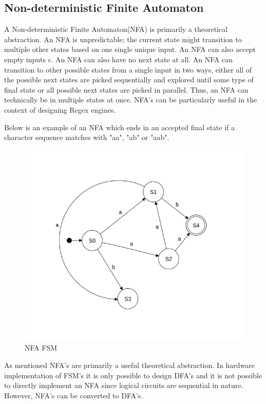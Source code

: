 \documentclass[a4paper,11pt]{article}
\begin{document}
\subsection*{Non-deterministic Finite Automaton}
A Non-deterministic Finite Automaton(NFA) is primarily a theoretical abstraction. An NFA is unpredictable; the current state might transition to multiple other states based on one single unique input. An NFA can also accept empty inputs $\epsilon$. An NFA can also have no next state at all. An NFA can transition to other possible states from a single input in two ways, either all of the possible next states are picked sequentially and explored until some type of final state or all possible next states are picked in parallel. Thus, an NFA can technically be in multiple states at once. NFA's can be particularly useful in the context of designing Regex engines. 

Below is an example of an NFA  which ends in an accepted final state if a character sequence matches with "aa", "ab" or "aab". 
\begin{figure}[H]
    \centering
    \includegraphics[width=1\textwidth]{fsm_schema.png}
    \caption{NFA FSM}
    \label{fig:example_image}
\end{figure}


As mentioned NFA's are primarily a useful theoretical abstraction. In hardware implementation of FSM's it is only possible to design DFA's and it is not possible to directly implement an NFA since logical circuits are sequential in nature. However, NFA's can be converted to DFA's. 
\end{document}
